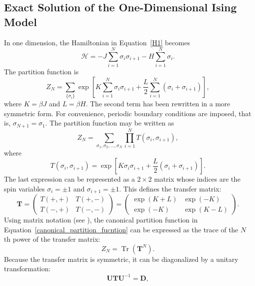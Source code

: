 \documentclass[a4paper]{article}
\begin{document}
\subsection{Exact Solution of the One-Dimensional Ising Model}
In one dimension, the Hamiltonian in Equation~\ref{H1} becomes
\begin{equation}
\mathcal{H}=-J\sum_{i=1}^{N}\sigma_i\sigma_{i+1}-H\sum_{i=1}^{N}\sigma_i.
\end{equation}
The partition function is
\begin{equation}
Z_N=\sum_{\{\sigma_i\}}\exp\left[K\sum_{i=1}^{N}\sigma_i\sigma_{i+1}+\frac{L}{2}\sum_{i=1}^{N}(\sigma_i+\sigma_{i+1})\right],
\end{equation}
where $K=\beta J$ and $L=\beta H$. The second term has been rewritten in a more symmetric form. For convenience, periodic boundary conditions are imposed, that is, $\sigma_{N+1}=\sigma_1$. The partition function may be written as
\begin{equation}\label{canonical_partition_fucntion}
Z_N=\sum_{\sigma_1,\sigma_2,\ldots,\sigma_N}\prod_{i=1}^{N}T(\sigma_i,\sigma_{i+1}),
\end{equation}
where
\begin{equation}
T(\sigma_i,\sigma_{i+1})=\exp\left[K\sigma_i\sigma_{i+1}+\frac{L}{2}(\sigma_i+\sigma_{i+1})\right].
\end{equation}
The last expression can be represented as a $2\times2$ matrix whose indices are the spin variables $\sigma_i=\pm1$ and $\sigma_{i+1}=\pm1$. This defines the transfer matrix:
\begin{equation}
\mathbf{T}=
\begin{pmatrix}
T(+,+) & T(+,-)\\
T(-,+) & T(-,-)
\end{pmatrix}
=
\begin{pmatrix}
\exp(K+L) & \exp(-K)\\
\exp(-K) & \exp(K-L)
\end{pmatrix}.
\end{equation}
Using matrix notation (see \cite{Salinas,Pathria}), the canonical partition function in Equation~\ref{canonical_partition_fucntion} can be expressed as the trace of the $N$th power of the transfer matrix:
\begin{equation}
Z_N=\operatorname{Tr}(\mathbf{T}^N).
\end{equation}
Because the transfer matrix is symmetric, it can be diagonalized by a unitary transformation:
\begin{equation*}
\mathbf{U}\mathbf{T}\mathbf{U}^{-1}=\mathbf{D},
\end{equation*}
\end{document}

